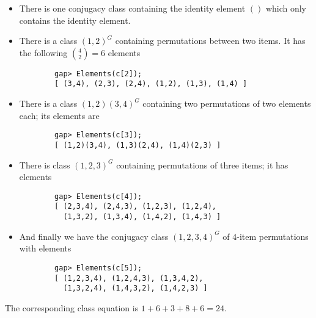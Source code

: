 \begin{itemize}
    \item There is one conjugacy class containing the identity element $()$ which only contains the identity element.

    \item There is a class $(1,2)^G$ containing permutations between two items. It has the following ${4 \choose 2} = 6$ elements

    \begin{verbatim}
        gap> Elements(c[2]);
        [ (3,4), (2,3), (2,4), (1,2), (1,3), (1,4) ]
    \end{verbatim}

    \item There is a class $(1,2)(3,4)^G$ containing two permutations of two elements each; its elements are
    
    \begin{verbatim}
        gap> Elements(c[3]);
        [ (1,2)(3,4), (1,3)(2,4), (1,4)(2,3) ]
    \end{verbatim}

    \item There is class $(1,2,3)^G$ containing permutations of three items; it has elements
    
    \begin{verbatim}
        gap> Elements(c[4]);
        [ (2,3,4), (2,4,3), (1,2,3), (1,2,4), 
          (1,3,2), (1,3,4), (1,4,2), (1,4,3) ]
    \end{verbatim}

    \item And finally we have the conjugacy class $(1,2,3,4)^G$ of 4-item permutations with elements
    
    \begin{verbatim}
        gap> Elements(c[5]);
        [ (1,2,3,4), (1,2,4,3), (1,3,4,2), 
          (1,3,2,4), (1,4,3,2), (1,4,2,3) ]
    \end{verbatim}

\end{itemize}

The corresponding class equation is $1 + 6 + 3 + 8 + 6 = 24$.

